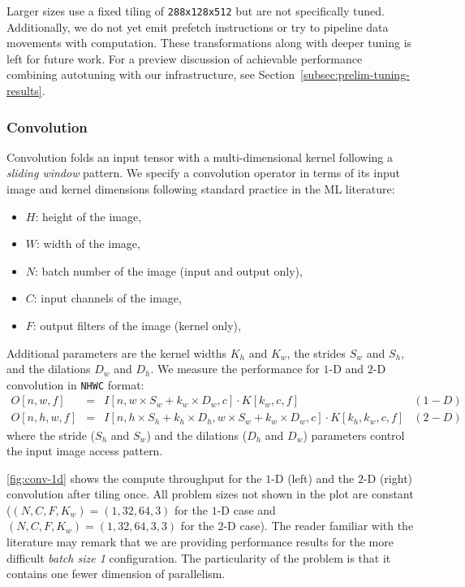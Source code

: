 Larger sizes use a fixed tiling of \lstinline|288x128x512| but are not specifically tuned.
Additionally, we do not yet emit prefetch instructions or try to pipeline data movements with computation. 
These transformations along with deeper tuning is left for future work.
For a preview discussion of achievable performance combining autotuning with our infrastructure, see Section~\ref{subsec:prelim-tuning-results}.

\subsubsection{Convolution}

Convolution folds an input tensor with a multi-dimensional kernel following a \emph{sliding window} pattern.
We specify a convolution operator in terms of its input image and kernel dimensions following standard practice in the ML literature:
\begin{itemize}
 \item $H$: height of the image,
 \item $W$: width of the image,
 \item $N$: batch number of the image (input and output only),
 \item $C$: input channels of the image,
 \item $F$: output filters of the image (kernel only),
\end{itemize}
Additional parameters are the kernel widths $K_h$ and $K_w$, the strides $S_w$ and $S_h$, and the dilations $D_w$ and $D_h$. We measure the performance for $1$-D and $2$-D convolution in \lstinline|NHWC| format:
\begin{equation*}
\begin{array}{llll}
O[n,w,f] &=& I[n,w\times S_w+k_w\times D_w,c]\cdot K[k_w,c,f] & (1-D) \\
O[n,h,w,f] &=& I[n,h\times S_h+k_h\times D_h,w\times S_w+k_w\times D_w,c]\cdot K[k_h,k_w,c,f] & (2-D)
\end{array}
\end{equation*}
where the stride ($S_h$ and $S_w$) and the dilations ($D_h$ and $D_w$) parameters control the input image access pattern. 

\autoref{fig:conv-1d} shows the compute throughput for the $1$-D (left) and the $2$-D (right) convolution after tiling once. 
All problem sizes not shown in the plot are constant ($(N,C,F,K_w)=(1,32,64,3)$ for the $1$-D case and $(N,C,F,K_w)=(1,32,64,3,3)$ for the $2$-D case).
The reader familiar with the literature may remark that we are providing performance results for the more difficult \emph{batch size 1} configuration.
The particularity of the problem is that it contains one fewer dimension of parallelism.

